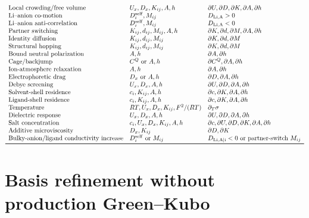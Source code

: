\documentclass[11pt]{article}
\begin{document}
\[\begin{array}{lll}
  \text{Local crowding/free volume} & U_x,D_x,K_{ij},A,h & \partial U,\partial D,\partial K,\partial A,\partial h\\
  \text{Li--anion co-motion} & D_i^{\rm self},M_{ij} & D_{\rm Li,A}>0\\
  \text{Li--anion anti-correlation} & D_i^{\rm self},M_{ij} & D_{\rm Li,A}<0\\
  \text{Partner switching} & K_{ij},d_{ij},M_{ij},A,h & \partial K,\partial d,\partial M,\partial A,\partial h\\
  \text{Identity diffusion} & K_{ij},d_{ij},M_{ij} & \partial K,\partial d,\partial M\\
  \text{Structural hopping} & K_{ij},d_{ij},M_{ij} & \partial K,\partial d,\partial M\\
  \text{Bound neutral polarization} & A,h & \partial A,\partial h\\
  \text{Cage/backjump} & C^Q \text{ or } A,h & \partial C^Q,\partial A,\partial h\\
  \text{Ion-atmosphere relaxation} & A,h & \partial A,\partial h\\
  \text{Electrophoretic drag} & D_x \text{ or } A,h & \partial D,\partial A,\partial h\\
  \text{Debye screening} & U_x,D_x,A,h & \partial U,\partial D,\partial A,\partial h\\
  \text{Solvent-shell residence} & c_i,K_{ij},A,h & \partial c,\partial K,\partial A,\partial h\\
  \text{Ligand-shell residence} & c_i,K_{ij},A,h & \partial c,\partial K,\partial A,\partial h\\
  \text{Temperature} & RT,U_x,D_x,K_{ij},F^2/(RT) & \partial_T\sigma\\
  \text{Dielectric response} & U_x,D_x,A,h & \partial U,\partial D,\partial A,\partial h\\
  \text{Salt concentration} & c_i,U_x,D_x,K_{ij},A,h & \partial c,\partial U,\partial D,\partial K,\partial A,\partial h\\
  \text{Additive microviscosity} & D_x,K_{ij} & \partial D,\partial K\\
  \text{Bulky-anion/ligand conductivity increase} & D_i^{\rm self}\text{ or }M_{ij} &
  D_{\rm Li,A|i}<0\text{ or partner-switch }M_{ij}\\
  \bottomrule
  \end{array}
  \]

  \section{Basis refinement without production Green--Kubo}
\end{document}
